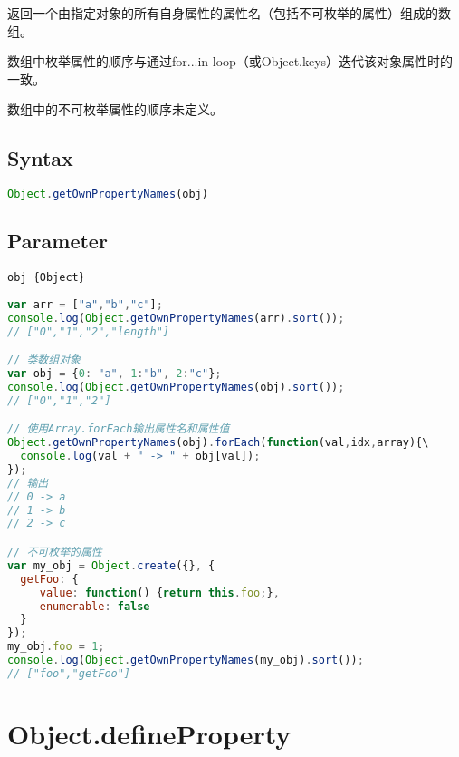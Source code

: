 返回一个由指定对象的所有自身属性的属性名（包括不可枚举的属性）组成的数组。

\begin{compactitem}
\item 数组中枚举属性的顺序与通过for...in loop（或Object.keys）迭代该对象属性时的一致。
\item 数组中的不可枚举属性的顺序未定义。
\end{compactitem}

\subsection{Syntax}



\begin{lstlisting}[language=JavaScript]
Object.getOwnPropertyNames(obj)
\end{lstlisting}


\subsection{Parameter}


\begin{compactitem}
\item \texttt{obj \{Object\}}
\end{compactitem}



\begin{lstlisting}[language=JavaScript]
var arr = ["a","b","c"];
console.log(Object.getOwnPropertyNames(arr).sort()); 
// ["0","1","2","length"]

// 类数组对象
var obj = {0: "a", 1:"b", 2:"c"};
console.log(Object.getOwnPropertyNames(obj).sort());
// ["0","1","2"]

// 使用Array.forEach输出属性名和属性值
Object.getOwnPropertyNames(obj).forEach(function(val,idx,array){\
  console.log(val + " -> " + obj[val]);
});
// 输出
// 0 -> a
// 1 -> b
// 2 -> c

// 不可枚举的属性
var my_obj = Object.create({}, {
  getFoo: {
     value: function() {return this.foo;},
     enumerable: false
  }
});
my_obj.foo = 1;
console.log(Object.getOwnPropertyNames(my_obj).sort()); 
// ["foo","getFoo"]
\end{lstlisting}


\section{Object.defineProperty}

